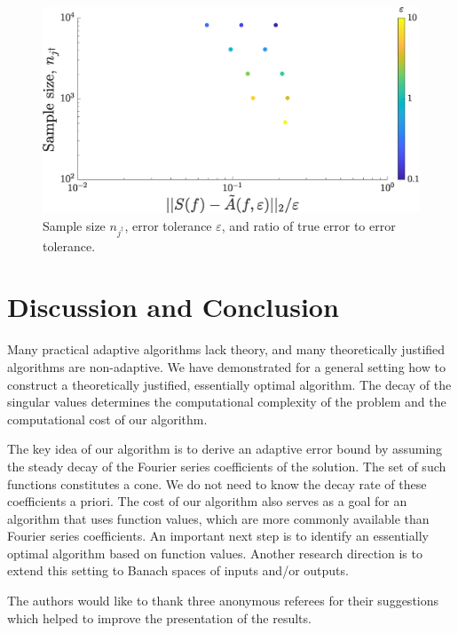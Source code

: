 \documentclass[graybox,footinfo]{svmult}
\begin{document}
\begin{figure}[ht]
 	\centering
 		\includegraphics[width =7.5 cm]{ProgramsImages/SimFourCoefErr.eps}
 	\caption{Sample size $n_{j^{\dagger}}$, error tolerance $\varepsilon$, and ratio of true error to error tolerance. \label{errfig}} %
 \end{figure}

\section{Discussion and Conclusion} \label{sec:conc}
Many practical adaptive algorithms lack theory, and many theoretically justified algorithms are non-adaptive.  We have demonstrated for a general setting how to construct a theoretically justified, essentially optimal algorithm.  The decay of the singular values determines the computational complexity of the problem and the computational cost of our algorithm.  

The key idea of our algorithm is to derive an adaptive error bound by assuming the steady decay of the Fourier series coefficients of the solution.  The set of such functions constitutes a cone.  We do not need to know the decay rate of these coefficients a priori.  The cost of our algorithm also serves as a goal for an algorithm that uses function values, which are more commonly available than Fourier series coefficients.  An important next step is to identify an essentially optimal algorithm based on function values.  Another research direction is to extend this setting to Banach spaces of inputs and/or outputs.

\begin{acknowledgement}
The authors would like to thank three anonymous referees for their suggestions which helped to improve the presentation of the results.


\end{acknowledgement}



\end{document}
